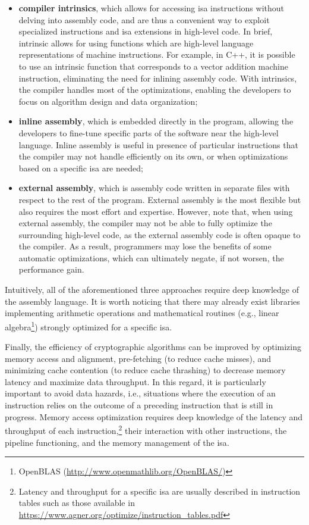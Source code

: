 \begin{itemize}
	
	\item \textbf{compiler intrinsics}, which allows for accessing \gls{isa} instructions without delving into assembly code, and are thus a convenient way to exploit specialized instructions and \gls{isa} extensions in high-level code. In brief, intrinsic allows for using functions which are high-level language representations of machine instructions. For example, in C++, it is possible to use an intrinsic function that corresponds to a vector addition machine instruction, eliminating the need for inlining assembly code. With intrinsics, the compiler handles most of the optimizations, enabling the developers to focus on algorithm design and data organization;
	
	\item \textbf{inline assembly}, which is embedded directly in the program, allowing the developers to fine-tune specific parts of the software near the high-level language. Inline assembly is useful in presence of particular instructions that the compiler may not handle efficiently on its own, or when optimizations based on a specific \gls{isa} are needed;
	
	\item \textbf{external assembly}, which is assembly code written in separate files with respect to the rest of the program. External assembly is the most flexible but also requires the most effort and expertise. However, note that, when using external assembly, the compiler may not be able to fully optimize the surrounding high-level code, as the external assembly code is often opaque to the compiler. As a result, programmers may lose the benefits of some automatic optimizations, which can ultimately negate, if not worsen, the performance gain.
	
\end{itemize}

Intuitively, all of the aforementioned three approaches require deep knowledge of the assembly language. It is worth noticing that there may already exist libraries implementing arithmetic operations and mathematical routines (e.g., linear algebra\footnote{OpenBLAS (\url{http://www.openmathlib.org/OpenBLAS/})}) strongly optimized for a specific \gls{isa}.

Finally, the efficiency of cryptographic algorithms can be improved by optimizing memory access and alignment, pre-fetching (to reduce cache misses), and minimizing cache contention (to reduce cache thrashing) to decrease memory latency and maximize data throughput. In this regard, it is particularly important to avoid data hazards, i.e., situations where the execution of an instruction relies on the outcome of a preceding instruction that is still in progress. Memory access optimization requires deep knowledge of the latency and throughput of each instruction,\footnote{Latency and throughput for a specific \gls{isa} are usually described in instruction tables such as those available in \url{https://www.agner.org/optimize/instruction_tables.pdf}} their interaction with other instructions, the pipeline functioning, and the memory management of the \gls{isa}. 

